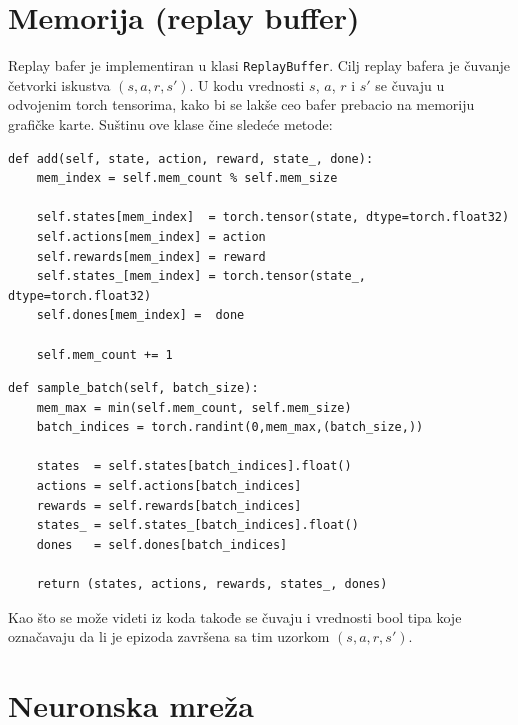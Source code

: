 \documentclass[a4paper,fleqn,12pt]{JMThesis}
\newcommand{\latin}{\fontencoding{T1}\selectfont\selectlanguage{english}}
\theoremstyle{plain}
\theoremstyle{definition}
\theoremstyle{definition}
\begin{document}
\section{Memorija (replay buffer)}
Replay bafer je implementiran u klasi \texttt{ReplayBuffer}. Cilj replay bafera je čuvanje četvorki iskustva $(s,a,r,s')$.
U kodu vrednosti $s$, $a$, $r$ i $s'$ se čuvaju u odvojenim torch tensorima, kako bi se lakše ceo bafer prebacio na memoriju grafičke karte.
Suštinu ove klase čine sledeće metode:
\begin{verbatim}
def add(self, state, action, reward, state_, done):
	mem_index = self.mem_count % self.mem_size
	
	self.states[mem_index]  = torch.tensor(state, dtype=torch.float32)
	self.actions[mem_index] = action
	self.rewards[mem_index] = reward
	self.states_[mem_index] = torch.tensor(state_, dtype=torch.float32)
	self.dones[mem_index] =  done

	self.mem_count += 1
\end{verbatim}
\begin{verbatim}
def sample_batch(self, batch_size):
	mem_max = min(self.mem_count, self.mem_size)
	batch_indices = torch.randint(0,mem_max,(batch_size,))

	states  = self.states[batch_indices].float()
	actions = self.actions[batch_indices]
	rewards = self.rewards[batch_indices]
	states_ = self.states_[batch_indices].float()
	dones   = self.dones[batch_indices]

	return (states, actions, rewards, states_, dones)
\end{verbatim}
Kao što se može videti iz koda takođe se čuvaju i vrednosti bool tipa koje označavaju da li je epizoda završena sa tim uzorkom $(s,a,r,s')$.
\section{Neuronska mreža}

\renewcommand\bibname{ Literatura}
\latin
\printbibliography[title=Literatura]
\medskip
\end{document}
